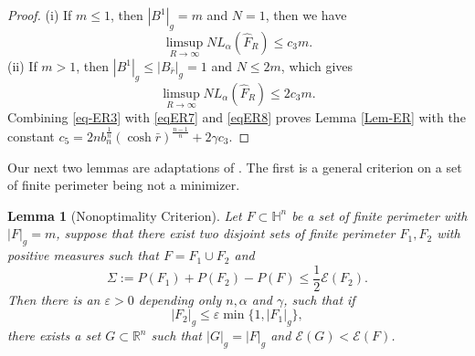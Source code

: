 \documentclass[11pt,reqno]{amsart}
\newtheorem{lem}[thm]{Lemma}
\theoremstyle{definition}
\theoremstyle{remark}
\numberwithin{equation}{section}
\renewcommand{\(}{\left(}
\renewcommand{\)}{\right)}
\renewcommand{\-}{\overline}
\begin{document}
\begin{proof}
 \noindent(i) If $m\leq 1$, then $|B^1|_g=m$ and $N=1$, then we have
 \begin{equation}\label{eqER7}
 	\limsup_{R\to\infty}NL_{\alpha}(\widehat{F}_R)\leq c_3m.
 \end{equation}
 (ii) If $m>1$, then $|B^1|_g\leq |B_{\bar{r}}|_g=1$ and $N\leq 2m$, which gives
 \begin{equation}\label{eqER8}
 	\limsup_{R\to\infty}NL_{\alpha}(\widehat{F}_R)\leq 2c_3m.
 \end{equation}
 Combining \eqref{eq-ER3} with \eqref{eqER7} and \eqref{eqER8} proves Lemma \ref{Lem-ER} with the constant $c_5=2n b_n^{\frac{1}{n}}(\cosh\bar{r})^{\frac{n-1}{n}}+2\gamma c_3$.
\end{proof}

Our next two lemmas are adaptations of \cite[Lemma 4.2, Lemma 4.3]{Knupfer-Muratov14}. The first is a general criterion on a set of finite perimeter being not a minimizer.
\begin{lem}[Nonoptimality Criterion]\label{Lem-Cri}
	Let $F\subset\mathbb{H}^n$ be a set of finite perimeter with $|F|_g=m$, suppose that there exist two disjoint sets of finite perimeter $F_1, F_2$ with positive measures such that $F=F_1\cup F_2$ and
	\begin{equation}\label{Lem-Cri1}
		\Sigma:=P(F_1)+P(F_2)-P(F)\leq\frac{1}{2}\mathcal{E}(F_2).
	\end{equation}
	Then there is an $\varepsilon>0$ depending only $n,\alpha$ and $\gamma$, such that if
	\begin{equation}\label{Lem-Cri2}
		|F_2|_g\leq\varepsilon\min\{1,|F_1|_g\},
	\end{equation}
there exists a set $G\subset\mathbb{R}^n$ such that $|G|_g=|F|_g$ and $\mathcal{E}(G)<\mathcal{E}(F)$. 
\end{lem}
\end{document}
